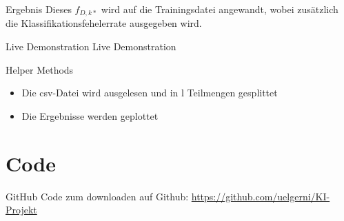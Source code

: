\documentclass[12pt,ngerman,a4paper,xcolor={dvipsnames}]{beamer}
\begin{document}
\begin{frame}{Ergebnis}
	Dieses $f_{D,k*}$ wird auf die Trainingsdatei angewandt, wobei zusätzlich die Klassifikationsfehelerrate ausgegeben wird.	
\end{frame}

\begin{frame}{Live Demonstration}
	Live Demonstration 
\end{frame}

\begin{frame}{Helper Methods}
	\begin{itemize}
		\item Die csv-Datei wird ausgelesen und in l Teilmengen gesplittet
		\item Die Ergebnisse werden geplottet
	\end{itemize}
	
\end{frame}


\section{Code}

\begin{frame}{GitHub}
	Code zum downloaden auf Github: \url{https://github.com/uelgerni/KI-Projekt}
\end{frame}
\end{document}

